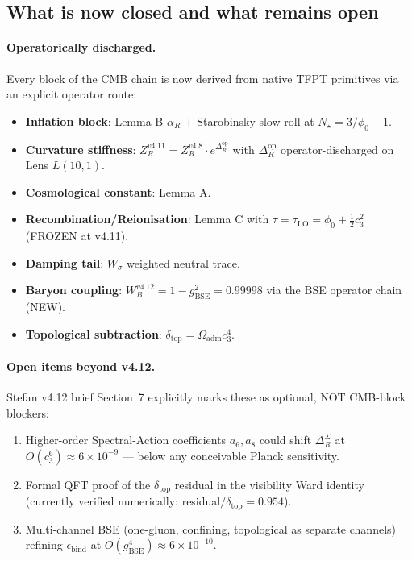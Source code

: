 \documentclass[11pt,a4paper]{article}
\begin{document}
\subsection{What is now closed and what remains open}
\label{sec:v412_closure}

\paragraph{Operatorically discharged.}  Every block of the CMB
chain is now derived from native TFPT primitives via an explicit
operator route:
\begin{itemize}[leftmargin=1.4em]
\item \textbf{Inflation block}: Lemma B \(\alpha_R\) +
Starobinsky slow-roll at \(N_\star=3/\phi_0-1\).
\item \textbf{Curvature stiffness}:
\(Z_R^{v4.11} = Z_R^{v4.8} \cdot e^{\Delta_R^{\mathrm{op}}}\) with
\(\Delta_R^{\mathrm{op}}\) operator-discharged on Lens \(L(10,1)\).
\item \textbf{Cosmological constant}: Lemma A.
\item \textbf{Recombination/Reionisation}: Lemma C with
\(\tau=\tau_{\mathrm{LO}}=\phi_0+\tfrac12 c_3^2\) (FROZEN at v4.11).
\item \textbf{Damping tail}: \(W_\sigma\) weighted neutral trace.
\item \textbf{Baryon coupling}:
\(W_B^{v4.12}=1-g_{\mathrm{BSE}}^2=0.99998\) via the BSE operator
chain (NEW).
\item \textbf{Topological subtraction}:
\(\delta_{\mathrm{top}}=\Omega_{\mathrm{adm}}c_3^4\).
\end{itemize}

\paragraph{Open items beyond v4.12.}  Stefan v4.12 brief Section~7
explicitly marks these as optional, NOT CMB-block blockers:
\begin{enumerate}[leftmargin=1.4em]
\item Higher-order Spectral-Action coefficients
\(a_6, a_8\) could shift \(\Delta_R^\Sigma\) at \(O(c_3^6)
\approx 6\times 10^{-9}\) --- below any conceivable Planck
sensitivity.
\item Formal QFT proof of the \(\delta_{\mathrm{top}}\) residual
in the visibility Ward identity (currently verified numerically:
residual\(/\delta_{\mathrm{top}}=0.954\)).
\item Multi-channel BSE (one-gluon, confining, topological as
separate channels) refining \(\epsilon_{\mathrm{bind}}\) at
\(O(g_{\mathrm{BSE}}^4)\approx 6\times 10^{-10}\).
\end{enumerate}
\end{document}
